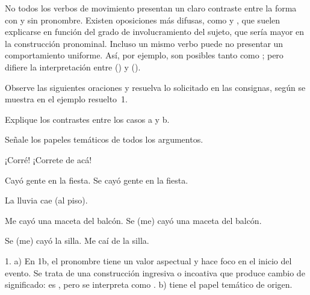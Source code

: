 No todos los verbos de movimiento presentan un claro contraste entre la forma
con y sin pronombre. Existen oposiciones más difusas, como  y , que suelen explicarse en función del grado de involucramiento del
sujeto, que sería mayor en la construcción pronominal. Incluso un mismo verbo
puede no presentar un comportamiento uniforme. Así, por ejemplo, son posibles
tanto  como ;
pero difiere la interpretación entre 
() y 
().

\begin{ejercicio}\label{ej:10-correr}
Observe las siguientes oraciones y resuelva lo solicitado en las consignas,
según se muestra en el ejemplo resuelto~1.

\begin{consignas}
  \item Explique los contrastes entre los casos a y b.
  \item Señale los papeles temáticos de todos los argumentos.
\end{consignas}

\begin{exe}
  \ex
    \begin{xlist}
      \ex ¡Corré!
      \ex ¡Correte de acá!
    \end{xlist}
  \ex
    \begin{xlist}
      \ex Cayó gente en la fiesta.
      \ex Se cayó gente en la fiesta.
    \end{xlist}
  \ex
    \begin{xlist}
      \ex La lluvia cae (al piso).
    \end{xlist}
  \ex
    \begin{xlist}
      \ex Me cayó una maceta del balcón.
      \ex Se (me) cayó una maceta del balcón.
    \end{xlist}
  \ex
    \begin{xlist}
      \ex Se (me) cayó la silla.
      \ex Me caí de la silla.
    \end{xlist}
\end{exe}

\begin{resuelto}
1. a) En 1b, el pronombre  tiene un valor aspectual y hace foco en el
inicio del evento. Se trata de una construcción ingresiva o incoativa que
produce cambio de significado:  es , pero  se interpreta como
. b)  tiene el papel
temático de origen.
\end{resuelto}
\end{ejercicio}

